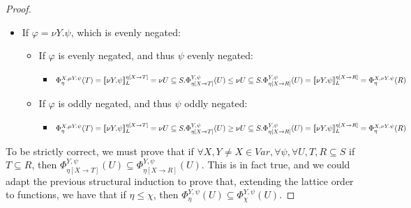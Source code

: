 \documentclass[11pt]{article}
\theoremstyle{definition}
\theoremstyle{plain}
\let\temp\phi
\let\phi\varphi
\let\varphi\temp
\begin{document}
\begin{appendices}
\begin{proof}
\begin{itemize}
\begin{itemize}
\begin{itemize}
\end{itemize}
\end{itemize}
\item If $ \phi = \nu Y.\psi $, which is evenly negated:
\begin{itemize}
\item If $ \phi $ is evenly negated, and thus $ \psi $ evenly negated:
\begin{itemize}
\item $ \Phi_{\eta}^{X,\mu Y.\psi}(T) = \llbracket \nu Y.\psi \rrbracket_L^{\eta[X\rightarrow T]} = \nu U\subseteq S.\Phi_{\eta[X\rightarrow T]}^{Y,\psi}(U) \leq \\ \nu U\subseteq S.\Phi_{\eta[X\rightarrow R]}^{Y,\psi}(U) = \llbracket \nu Y.\psi \rrbracket_L^{\eta[X\rightarrow R]} = \Phi_{\eta}^{X,\nu Y.\psi}(R)$
\end{itemize}
\item If $ \phi $ is oddly negated, and thus $ \psi $ oddly negated:
\begin{itemize}
\item $ \Phi_{\eta}^{X,\mu Y.\psi}(T) = \llbracket \nu Y.\psi \rrbracket_L^{\eta[X\rightarrow T]} = \nu U\subseteq S.\Phi_{\eta[X\rightarrow T]}^{Y,\psi}(U) \geq \\ \nu U\subseteq S.\Phi_{\eta[X\rightarrow R]}^{Y,\psi}(U) = \llbracket \nu Y.\psi \rrbracket_L^{\eta[X\rightarrow R]} = \Phi_{\eta}^{X,\nu Y.\psi}(R)$
\end{itemize}
\end{itemize}
\end{itemize}
To be strictly correct, we must prove that if $ \forall X,Y\not=X \in Var, \forall \psi, \forall U,T,R\subseteq S$ if $ T \subseteq R $, then $\Phi_{\eta[X\rightarrow T]}^{Y,\psi}(U) \subseteq \Phi_{\eta[X\rightarrow R]}^{Y,\psi}(U)$. This is in fact true, and we could adapt the previous structural induction to prove that, extending the lattice order to functions, we have that if $ \eta \leq \chi $, then $\Phi_{\eta}^{Y,\psi}(U) \subseteq \Phi_{\chi}^{Y,\psi}(U)$.
\end{proof}

\end{appendices}


\newpage

{}
\end{document}
